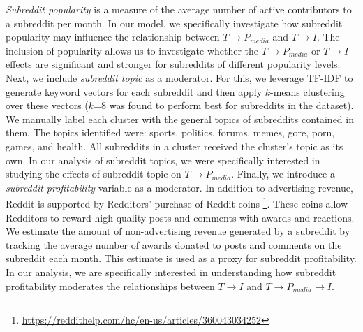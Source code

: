  \emph{Subreddit popularity} is
a measure of the average number of active contributors to
a subreddit per month. In our model, we specifically investigate how subreddit
popularity may influence the relationship between $T \rightarrow P_{media}$ and
$T \rightarrow I$. The inclusion of popularity allows us to investigate whether
the $T \rightarrow P_{media}$ or $T \rightarrow I$ effects are significant and
stronger for subreddits of different popularity levels. 
Next, we include \emph{subreddit topic} as a moderator. For this, we leverage
TF-IDF to generate keyword vectors for each subreddit and then apply $k$-means
clustering over these vectors ($k$=8 was found to perform best for subreddits
in the  dataset). We manually label each cluster with the general
topics of subreddits contained in them. The topics identified were: sports,
politics, forums, memes, gore, porn, games, and health. All
subreddits in a cluster received the cluster's topic as its own. In our
analysis of subreddit topics, we were specifically interested in studying the
effects of subreddit topic on $T \rightarrow P_{media}$.
Finally, we introduce a \emph{subreddit profitability} variable as a moderator.
In addition to advertising revenue, Reddit is supported by Redditors' purchase
of Reddit coins
\footnote{\url{https://reddithelp.com/hc/en-us/articles/360043034252}}. These
coins allow Redditors to reward high-quality posts and comments with awards and
reactions. We estimate the amount of non-advertising revenue generated by
a subreddit by tracking the average number of awards donated to posts and
comments on the subreddit each month. This estimate is used as a proxy for
subreddit profitability. In our analysis, we are specifically interested in
understanding how subreddit profitability moderates the relationships between
$T \rightarrow I$ and $T \rightarrow P_{media} \rightarrow I$.

